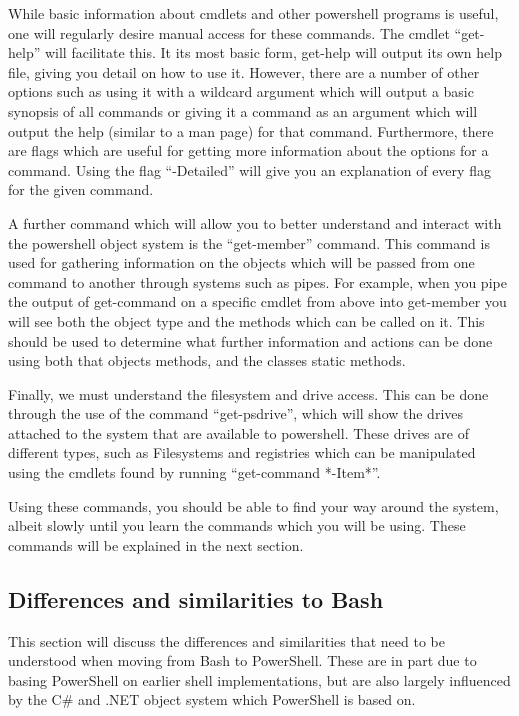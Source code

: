 			While basic information about cmdlets and other powershell programs is useful, one will regularly desire manual access for these commands. 
			The cmdlet ``get-help'' will facilitate this. 
			It its most basic form, get-help will output its own help file, giving you detail on how to use it. 
			However, there are a number of other options such as using it with a wildcard argument which will output a basic synopsis of all commands or giving it a command as an argument which will output the help (similar to a man page) for that command. 
			Furthermore, there are flags which are useful for getting more information about the options for a command. 
			Using the flag ``-Detailed'' will give you an explanation of every flag for the given command.

			A further command which will allow you to better understand and interact with the powershell object system is the ``get-member'' command. 
			This command is used for gathering information on the objects which will be passed from one command to another through systems such as pipes. 
			For example, when you pipe the output of get-command on a specific cmdlet from above into get-member you will see both the object type and the methods which can be called on it. 
			This should be used to determine what further information and actions can be done using both that objects methods, and the classes static methods. 

			Finally, we must understand the filesystem and drive access. 
			This can be done through the use of the command ``get-psdrive'', which will show the drives attached to the system that are available to powershell. 
			These drives are of different types, such as Filesystems and registries which can be manipulated using the cmdlets found by running ``get-command *-Item*''. 

			Using these commands, you should be able to find your way around the system, albeit slowly until you learn the commands which you will be using. 
			These commands will be explained in the next section. 

		\subsection{Differences and similarities to Bash}
			This section will discuss the differences and similarities that need to be understood when moving from Bash to PowerShell. 
			These are in part due to basing PowerShell on earlier shell implementations, but are also largely influenced by the C\# and .NET object system which PowerShell is based on. 

